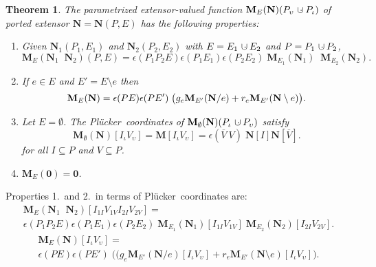 \documentclass[12pt]{article}
\newtheorem{theorem}{Theorem}[section]
\theoremstyle{definition}
\newcommand{\dunion}
{\mbox{\hbox{\hskip6pt$\cdot$\hskip-5.50pt$\cup$\hskip2pt}}}
\newcommand{\scomp}[1]{\ensuremath{\overline{#1}}}
\newcommand{\scma}{\ensuremath{\ }}
\newcommand{\Is}{\ensuremath{\iota}}
\newcommand{\Vs}{\ensuremath{\upsilon}}
\newcommand{\ext}[1]{\ensuremath{\mathbf{#1}}}
\newcommand{\extvee}{\;\;}
\newcommand{\Plucker}{Pl\"{u}cker\ }
\begin{document}
\begin{theorem}
\label{PairsTheoremMain}
The parametrized extensor-valued function 
$\ext{M}_E(\ext{N})(P_\Vs\dunion P_\Is)$ of ported extensor
$\ext{N}=\ext{N}(P,E)$
has the following properties:
\begin{enumerate}
\item
Given $\ext{N}_1(P_1,E_1)$ 
and $\ext{N}_2(P_2,E_2)$ with $E=E_1\dunion E_2$ and 
$P=P_1\dunion P_2$,
\begin{equation}
   \ext{M}_E(\ext{N}_1\extvee\ext{N}_2)(P,E) =
   \epsilon(P_1P_2E)\epsilon(P_1E_1)\epsilon(P_2E_2)\;
   \ext{M}_{E_1}(\ext{N}_1)\extvee
   \ext{M}_{E_2}(\ext{N}_2).
\end{equation}

\item
If $e\in E$ and $E'=E\setminus e$ then
\begin{equation}
   \ext{M}_E(\ext{N}) = \\
   \epsilon(PE)\epsilon(PE')\;
   \big(
   g_e\ext{M}_{E'}(\ext{N}/ e)
   +
   r_e\ext{M}_{E'}(\ext{N}\setminus e)\big).
\end{equation}
\item
Let $E=\emptyset$.  The \Plucker coordinates of 
$\ext{M}_\emptyset(\ext{N})(P_\Is\dunion P_\Vs)$ satisfy
\[
   \ext{M}_\emptyset(\ext{N})[I_{\Is}V_{\Vs}]=\ext{M}[I_{\Is}V_{\Vs}]=
    \epsilon(\scomp{V}\scma V)\;\ext{N}[I]\ext{N}[\scomp{V}].
\]
for all $I\subseteq P$ and $V\subseteq P$.

\item $\ext{M}_E(\ext{0}) = \ext{0}$.

\end{enumerate}
\end{theorem}

Properties 1.\  and 2.\  in terms of \Plucker coordinates are:
\begin{eqnarray}
\label{PairsThm10Pt1LHS}
\nonumber   \ext{M}_E(\ext{N}_1\extvee\ext{N}_2)[I_{1I}V_{1V}I_{2I}V_{2V}] =\\ 
   \epsilon(P_1P_2E)\epsilon(P_1E_1)\epsilon(P_2E_2)\;
   \ext{M}_{E_1}(\ext{N}_1)[I_{1I}V_{1V}]\;
     \ext{M}_{E_2}(\ext{N}_2)[I_{2I}V_{2V}].
\end{eqnarray}
\begin{eqnarray}
\nonumber   \ext{M}_E(\ext{N})[I_\Is V_\Vs]  = \\
   \epsilon(PE)\epsilon(PE')\;
   \big(
   (g_e\ext{M}_{E'}(\ext{N}/ e)[I_\Is V_\Vs]
   +
   r_e\ext{M}_{E'}(\ext{N}\setminus e)[I_\Is V_\Vs]\big).
\end{eqnarray}
\end{document}
